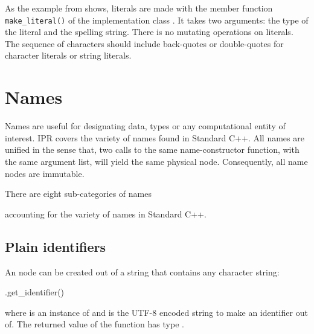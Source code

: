 \documentclass[11pt]{article}
\begin{document}
As the example from  shows, literals are made with
the member function \texttt{make\_literal()} of the implementation class
.  It takes two arguments:  the type of the literal and
the spelling string.  There is no mutating operations on literals.  The
sequence of characters should include back-quotes or double-quotes for
character literals or string literals. 

\section{Names}
\label{sec:name}

Names are useful for designating data, types or any computational entity of
interest. IPR covers the variety of names found in Standard C++.
All names are unified in the sense that, two calls to the same
name-constructor function, with the same argument list, will yield the same
physical node. Consequently, all name nodes are immutable.

There are eight sub-categories of names
\begin{Grammar}
\end{Grammar}
accounting for the variety of names in Standard C++.

\subsection{Plain identifiers}
\label{sec:name.identifier}

\begin{Grammar}
      
      
\end{Grammar}
An  node can be created out of a string that contains
any character string:
\begin{Program}
  .get_identifier()
\end{Program}
where  is an instance of  and  is
the UTF-8 encoded string to make an identifier out of.  The returned value of the
function  has type .
\end{document}
